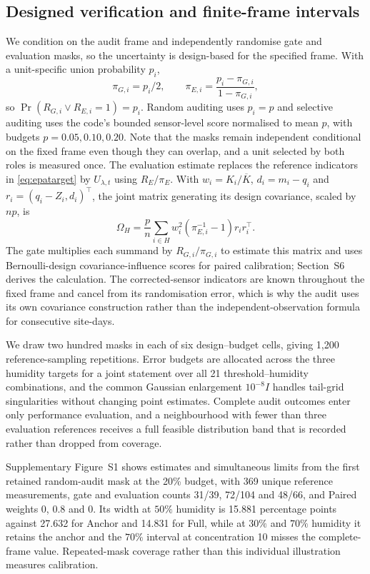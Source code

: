 \subsection{Designed verification and finite-frame intervals}
We condition on the audit frame and independently randomise gate and evaluation masks, so the uncertainty is design-based for the specified frame. With a unit-specific union probability $p_i$,
\begin{equation}\label{eq:twomasks}
 \pi_{G,i}=p_i/2,\qquad
 \pi_{E,i}=\frac{p_i-\pi_{G,i}}{1-\pi_{G,i}},
\end{equation}
so $\Pr(R_{G,i}\vee R_{E,i}=1)=p_i$. Random auditing uses $p_i=p$ and selective auditing uses the code's bounded sensor-level score normalised to mean $p$, with budgets $p=0.05,0.10,0.20$. Note that the masks remain independent conditional on the fixed frame even though they can overlap, and a unit selected by both roles is measured once. The evaluation estimate replaces the reference indicators in \eqref{eq:epatarget} by $U_{\lambda,t}$ using $R_E/\pi_E$. With $w_i=K_i/\overline K$, $d_i=m_i-q_i$ and $r_i=(q_i-Z_i,d_i)^\top$, the joint matrix generating its design covariance, scaled by $np$, is
\begin{equation}\label{eq:epacov}
 \Omega_H=\frac pn\sum_{i\in H}w_i^2(\pi_{E,i}^{-1}-1)r_ir_i^\top.
\end{equation}
The gate multiplies each summand by $R_{G,i}/\pi_{G,i}$ to estimate this matrix and uses Bernoulli-design covariance-influence scores for paired calibration; Section~S6 derives the calculation. The corrected-sensor indicators are known throughout the fixed frame and cancel from its randomisation error, which is why the audit uses its own covariance construction rather than the independent-observation formula for consecutive site-days.

We draw two hundred masks in each of six design--budget cells, giving 1,200 reference-sampling repetitions. Error budgets are allocated across the three humidity targets for a joint statement over all 21 threshold--humidity combinations, and the common Gaussian enlargement $10^{-8}I$ handles tail-grid singularities without changing point estimates. Complete audit outcomes enter only performance evaluation, and a neighbourhood with fewer than three evaluation references receives a full feasible distribution band that is recorded rather than dropped from coverage.

Supplementary Figure~S1 shows estimates and simultaneous limits from the first retained random-audit mask at the 20\% budget, with 369 unique reference measurements, gate and evaluation counts 31/39, 72/104 and 48/66, and Paired weights 0, 0.8 and 0. Its width at $50\%$ humidity is 15.881 percentage points against 27.632 for Anchor and 14.831 for Full, while at $30\%$ and $70\%$ humidity it retains the anchor and the $70\%$ interval at concentration 10 misses the complete-frame value. Repeated-mask coverage rather than this individual illustration measures calibration.

